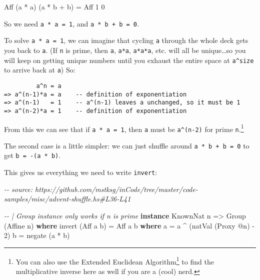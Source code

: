 \documentclass[]{article}
\newenvironment{Shaded}{}{}
\newcommand{\CommentTok}[1]{\textcolor[rgb]{0.38,0.63,0.69}{\textit{#1}}}
\newcommand{\DataTypeTok}[1]{\textcolor[rgb]{0.56,0.13,0.00}{#1}}
\newcommand{\DecValTok}[1]{\textcolor[rgb]{0.25,0.63,0.44}{#1}}
\newcommand{\FunctionTok}[1]{\textcolor[rgb]{0.02,0.16,0.49}{#1}}
\newcommand{\KeywordTok}[1]{\textcolor[rgb]{0.00,0.44,0.13}{\textbf{#1}}}
\newcommand{\NormalTok}[1]{#1}
\newcommand{\OperatorTok}[1]{\textcolor[rgb]{0.40,0.40,0.40}{#1}}
\newcommand{\OtherTok}[1]{\textcolor[rgb]{0.00,0.44,0.13}{#1}}
\renewcommand{\href}[2]{#2\footnote{\url{#1}}}
\begin{document}
\begin{Shaded}
\begin{Highlighting}[]
 \DataTypeTok{Aff}\NormalTok{ (a\textquotesingle{} }\OperatorTok{*}\NormalTok{ a) (a\textquotesingle{} }\OperatorTok{*}\NormalTok{ b }\OperatorTok{+}\NormalTok{ b\textquotesingle{}) }\OtherTok{=} \DataTypeTok{Aff} \DecValTok{1} \DecValTok{0}
\end{Highlighting}
\end{Shaded}

So we need \texttt{a\textquotesingle{}\ *\ a\ =\ 1}, and
\texttt{a\textquotesingle{}\ *\ b\ +\ b\textquotesingle{}\ =\ 0}.

To solve \texttt{a\textquotesingle{}\ *\ a\ =\ 1}, we can imagine that cycling
\texttt{a} through the whole deck gets you back to \texttt{a}. (If \texttt{n} is
prime, then \texttt{a}, \texttt{a*a}, \texttt{a*a*a}, etc. will all be
unique\ldots so you will keep on getting unique numbers until you exhaust the
entire space at \texttt{a\^{}size} to arrive back at \texttt{a}) So:

\begin{verbatim}
         a^n = a
=> a^(n-1)*a = a    -- definition of exponentiation
=> a^(n-1)   = 1    -- a^(n-1) leaves a unchanged, so it must be 1
=> a^(n-2)*a = 1    -- definition of exponentiation
\end{verbatim}

From this we can see that if \texttt{a\textquotesingle{}\ *\ a\ =\ 1}, then
\texttt{a\textquotesingle{}} must be \texttt{a\^{}(n-2)} for prime
\texttt{n}.\footnote{You can also use the
  \href{https://en.wikipedia.org/wiki/Extended_Euclidean_algorithm}{Extended
  Euclidean Algorithm} to find the multiplicative inverse here as well if you
  are a (cool) nerd.}

The second case is a little simpler: we can just shuffle around
\texttt{a\textquotesingle{}\ *\ b\ +\ b\textquotesingle{}\ =\ 0} to get
\texttt{b\textquotesingle{}\ =\ -(a\textquotesingle{}\ *\ b)}.

This gives us everything we need to write \texttt{invert}:

\begin{Shaded}
\begin{Highlighting}[]
\CommentTok{{-}{-} source: https://github.com/mstksg/inCode/tree/master/code{-}samples/misc/advent{-}shuffle.hs\#L36{-}L41}

\CommentTok{{-}{-} | Group instance only works if n is prime}
\KeywordTok{instance} \DataTypeTok{KnownNat}\NormalTok{ n }\OtherTok{=>} \DataTypeTok{Group}\NormalTok{ (}\DataTypeTok{Affine}\NormalTok{ n) }\KeywordTok{where}
\NormalTok{    invert (}\DataTypeTok{Aff}\NormalTok{ a b) }\OtherTok{=} \DataTypeTok{Aff}\NormalTok{ a\textquotesingle{} b\textquotesingle{}}
      \KeywordTok{where}
\NormalTok{        a\textquotesingle{} }\OtherTok{=}\NormalTok{ a }\OperatorTok{\^{}}\NormalTok{ (natVal (}\DataTypeTok{Proxy} \OperatorTok{@}\NormalTok{n) }\OperatorTok{{-}} \DecValTok{2}\NormalTok{)}
\NormalTok{        b\textquotesingle{} }\OtherTok{=} \FunctionTok{negate}\NormalTok{ (a\textquotesingle{} }\OperatorTok{*}\NormalTok{ b)}
\end{Highlighting}
\end{Shaded}
\end{document}
